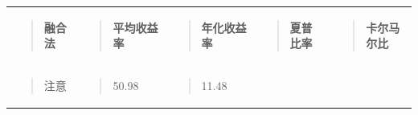\documentclass[UTF8]{ctexart}
\newcounter{none} %
\begin{document}
{\def\LTcaptype{none} %
\begin{longtable}[]{@{}
  >{\raggedright\arraybackslash}p{}
  >{\raggedright\arraybackslash}p{}
  >{\raggedright\arraybackslash}p{}
  >{\raggedright\arraybackslash}p{}
  >{\raggedright\arraybackslash}p{}@{}}
\toprule\noalign{}
\endhead
\bottomrule\noalign{}
\endlastfoot
\begin{minipage}[t]{\linewidth}\raggedright
\begin{quote}
\textbf{融合法}
\end{quote}
\end{minipage} & \begin{minipage}[t]{\linewidth}\raggedright
\begin{quote}
\textbf{平均收益率}
\end{quote}
\end{minipage} & \begin{minipage}[t]{\linewidth}\raggedright
\begin{quote}
\textbf{年化收益率}
\end{quote}
\end{minipage} & \begin{minipage}[t]{\linewidth}\raggedright
\begin{quote}
\textbf{夏普比率}
\end{quote}
\end{minipage} & \begin{minipage}[t]{\linewidth}\raggedright
\begin{quote}
\textbf{卡尔马尔比}
\end{quote}
\end{minipage} \\
\begin{minipage}[t]{\linewidth}\raggedright
\begin{quote}
注意
\end{quote}
\end{minipage} & \begin{minipage}[t]{\linewidth}\raggedright
\begin{quote}
50.98
\end{quote}
\end{minipage} & \begin{minipage}[t]{\linewidth}\raggedright
\begin{quote}
11.48
\end{quote}

\end{minipage}
\end{longtable}}
\end{document}
